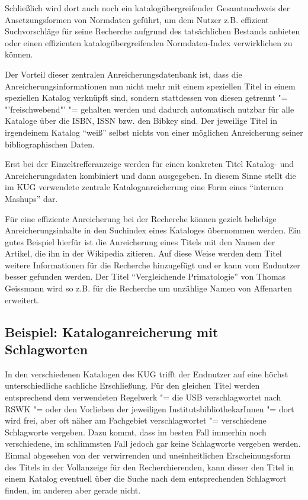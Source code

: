 \documentclass[11pt]{scrartcl}
\begin{document}
Schließlich wird dort auch noch ein katalogübergreifender
Gesamtnachweis der Ansetzungsformen von Normdaten geführt, um dem
Nutzer z.B. effizient Suchvorschläge für seine Recherche aufgrund des
tatsächlichen Bestands anbieten oder einen effizienten
katalogübergreifenden Normdaten-Index verwirklichen zu können.

Der Vorteil dieser zentralen Anreicherungsdatenbank ist, dass die
Anreicherungsinformationen nun nicht mehr mit einem speziellen Titel
in einem speziellen Katalog verknüpft sind, sondern stattdessen von
diesen getrennt "= "'freischwebend"' "= gehalten werden und dadurch
automatisch nutzbar für alle Kataloge über die ISBN, ISSN bzw. den
Bibkey sind. Der jeweilige Titel in irgendeinem Katalog "`weiß"'
selbst nichts von einer möglichen Anreicherung seiner
bibliographischen Daten.

Erst bei der Einzeltrefferanzeige werden für einen konkreten Titel
Katalog- und Anreicherungsdaten kombiniert und dann ausgegeben. In
diesem Sinne stellt die im KUG verwendete zentrale Kataloganreicherung
eine Form eines "`internen Mashups"' dar.

Für eine effiziente Anreicherung bei der Recherche können gezielt
beliebige Anreicherungsinhalte in den Suchindex eines Kataloges
übernommen werden. Ein gutes Beispiel hierfür ist die Anreicherung
eines Titels mit den Namen der Artikel, die ihn in der Wikipedia
zitieren. Auf diese Weise werden dem Titel weitere Informationen für
die Recherche hinzugefügt und er kann vom Endnutzer besser gefunden
werden. Der Titel "`Vergleichende Primatologie"' von Thomas Geissmann
wird so z.B. für die Recherche um unzählige Namen von Affenarten
erweitert.

\subsection{Beispiel: Kataloganreicherung mit Schlagworten}

In den verschiedenen Katalogen des KUG trifft der Endnutzer auf eine
höchst unterschiedliche sachliche Erschließung. Für den gleichen Titel
werden entsprechend dem verwendeten Regelwerk "= die USB
verschlagwortet nach RSWK "= oder den Vorlieben der jeweiligen
InstitutsbibliothekarInnen "= dort wird frei, aber oft näher am
Fachgebiet verschlagwortet "= verschiedene Schlagworte vergeben. Dazu
kommt, dass im besten Fall immerhin noch verschiedene, im schlimmsten
Fall jedoch gar keine Schlagworte vergeben werden. Einmal abgesehen
von der verwirrenden und uneinheitlichen Erscheinungsform des Titels
in der Vollanzeige für den Recherchierenden, kann dieser den Titel in
einem Katalog eventuell über die Suche nach dem entsprechenden
Schlagwort finden, im anderen aber gerade nicht.
\end{document}

